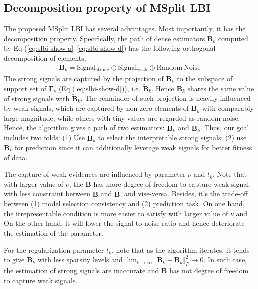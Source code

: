 \documentclass{article}
\begin{document}
\subsection{Decomposition property of MSplit LBI\label{subsec:Decomposition-property-of}}


The proposed MSplit LBI has several advantages. Most importantly,
it has the decomposition property. Specifically, the path of dense
estimators $\mathbf{B}_{k}$ computed by Eq (\ref{eq:slbi-show-a}–\ref{eq:slbi-show-d})
has the following orthogonal decomposition of elements,
\begin{align}
\mathbf{B}_{k}={\mathrm{Signal_{strong}}\oplus\mathrm{Signal_{weak}}\oplus\mathrm{Random\ Noise}}\label{eq:decomposition}
\end{align}
The strong signals are captured by the projection of $\mathbf{B}_{k}$
to the subspace of support set of $\mathbf{\Gamma}_{k}$ (Eq (\ref{eq:slbi-show-d})), {i.e. $\widetilde{\mathbf{B}}_{k}$}. {Hence $\mathbf{B}_{k}$ shares the same value of strong signals with $\widetilde{\mathbf{B}}_{k}$}. The remainder of such projection is heavily influenced by weak signals,
which are captured by non-zero elements of $\mathbf{B}_{k}$ with
comparably large magnitude, while others with tiny values are regarded
as random noise. Hence, the algorithm gives a path of two estimators:
$\mathbf{B}_{k}$ and $\widetilde{\mathbf{B}}_{k}$. {Thus, our goal includes two folds:} (1) Use $\widetilde{\mathbf{B}}_{k}$ to select the interpretable strong signals; (2) use $\mathbf{B}_{k}$ for prediction
 since it can additionally leverage weak signals for better fitness of data.


The capture of weak evidences are influenced by parameter $\nu$ and
$t_{k}$. Note that with larger value of $\nu$, the $\mathbf{B}$
has more degree of freedom to capture weak signal with less constraint
between $\mathbf{B}$ and $\widetilde{\mathbf{B}}$, and vise-versa. Besides,
it's the trade-off between (1) model selection consistency and (2)
prediction task. On one hand, the irrepresentable condition is more
easier to satisfy with larger value of $\nu$ and On the other hand,
it will lower the signal-to-noise ratio and hence deteriorate the
estimation of the parameter.


For the regularization parameter $t_{k}$, note that as the algorithm
iterates, it tends to give $\widetilde{\mathbf{B}}_{k}$ with less sparsity
levels and $\lim_{k\to\infty}\Vert \widetilde{\mathbf{B}}_{k}-\mathbf{B}_{k}\Vert_{F}^{2}\to0$.
In such case, the estimation of strong signals are inaccurate and
$\mathbf{B}$ has not degree of freedom to capture weak signals.
\end{document}
